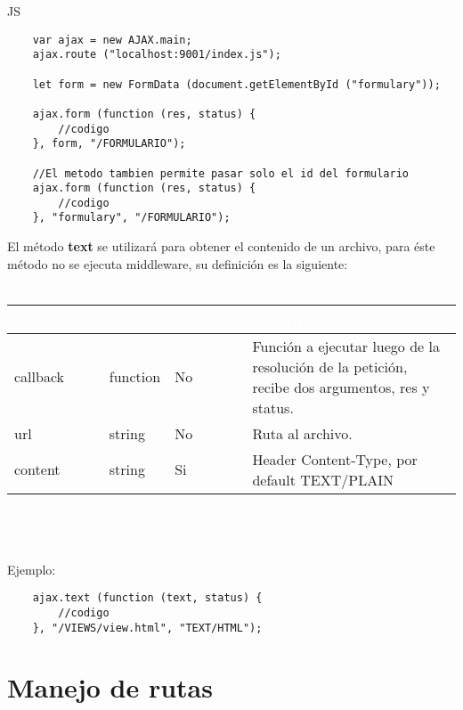 \documentclass[10pt]{article}
\begin{document}
\noindent
\footnotesize{JS} \normalsize{}
\lstset{language=JavaScript}
\begin{lstlisting}
	var ajax = new AJAX.main;
	ajax.route ("localhost:9001/index.js");
	
	let form = new FormData (document.getElementById ("formulary"));
	
	ajax.form (function (res, status) {
		//codigo
	}, form, "/FORMULARIO");
	
	//El metodo tambien permite pasar solo el id del formulario
	ajax.form (function (res, status) {
		//codigo
	}, "formulary", "/FORMULARIO");
\end{lstlisting}
\noindent
El método \textbf{text} se utilizará para obtener el contenido de un archivo, para éste método no se ejecuta middleware, su definición es la siguiente:
\\\\
\begin{tabular}{|m{1.8cm}|m{2cm}|m{1.5cm}|m{9cm}|}
	\hline
	\rowcolor{black}\textcolor{white}{Argumento} & \textcolor{white}{Tipo} & \textcolor{white}{Opcional} & \textcolor{white}{Descripción} \\
	\hline
	callback & function & No & Función a ejecutar luego de la resolución de la petición, recibe dos argumentos, res y status. \\
	\hline
	url & string & No & Ruta al archivo. \\
	\hline
	content & string & Si & Header Content-Type, por default TEXT/PLAIN \\
	\hline
\end{tabular}
\\\\\\
Ejemplo:

\begin{lstlisting}
	ajax.text (function (text, status) {
		//codigo
	}, "/VIEWS/view.html", "TEXT/HTML");
\end{lstlisting}

\newpage

\section{Manejo de rutas}
\end{document}
